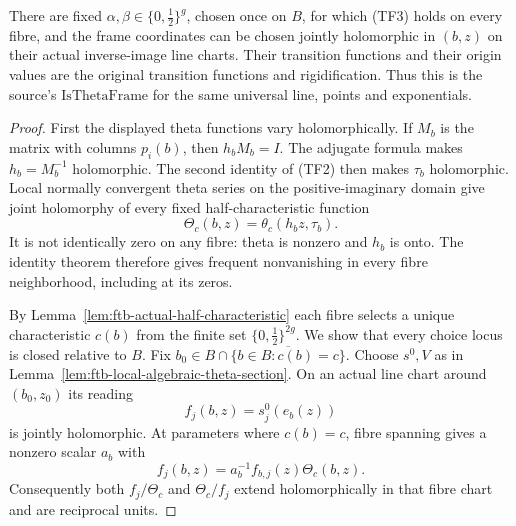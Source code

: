 \begin{proposition}
\label{prop:ftb-actual-family-theta-frame}
There are fixed \(\alpha,\beta\in\{0,\tfrac12\}^g\), chosen
once on \(B\), for which (TF3) holds on every fibre, and
the frame coordinates can be chosen jointly holomorphic
in \((b,z)\) on their actual inverse-image line charts.
Their transition functions and their origin values are
the original transition functions and rigidification.
Thus this is the source's
\(\mathrm{IsThetaFrame}\) for the same universal line,
points and exponentials.
\end{proposition}
\begin{proof}
First the displayed theta functions vary holomorphically.
If \(M_b\) is the matrix with columns \(p_i(b)\), then
\(h_bM_b=I\).  The adjugate formula makes \(h_b=M_b^{-1}\)
holomorphic.  The second identity of (TF2) then makes
\(\tau_b\) holomorphic.  Local normally convergent theta
series on the positive-imaginary domain give joint
holomorphy of every fixed half-characteristic function
\[
             \Theta_c(b,z)=\theta_c(h_bz,\tau_b).
\]
It is not identically zero on any fibre: theta is nonzero
and \(h_b\) is onto.  The identity theorem therefore gives
frequent nonvanishing in every fibre neighborhood,
including at its zeros.

By Lemma~\ref{lem:ftb-actual-half-characteristic} each fibre
selects a unique characteristic \(c(b)\) from the finite
set \(\{0,\tfrac12\}^{2g}\).
We show that every choice locus is closed relative to \(B\).
Fix \(b_0\in B\cap\overline{\{b\in B:c(b)=c\}}\).
Choose \(s^0,V\) as in
Lemma~\ref{lem:ftb-local-algebraic-theta-section}.
On an actual line chart around \((b_0,z_0)\) its reading
\[
                 f_j(b,z)=s^0_j(e_b(z))
\]
is jointly holomorphic.
At parameters where \(c(b)=c\), fibre spanning gives a
nonzero scalar \(a_b\) with
\[
       f_j(b,z)=a_b^{-1}f_{b,j}(z)\Theta_c(b,z).       \tag{TF6}
\]
Consequently both \(f_j/\Theta_c\) and
\(\Theta_c/f_j\) extend holomorphically in that fibre
chart and are reciprocal units.


\end{proof}
